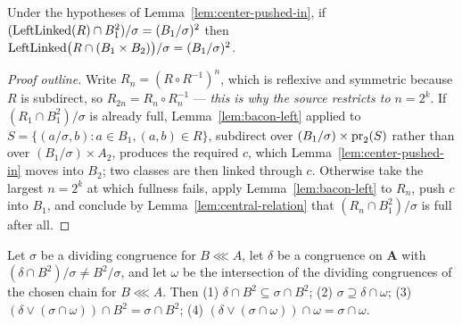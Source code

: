 \begin{lemma}\label{lem:leftlinked-stay-full}
Under the hypotheses of Lemma~\ref{lem:center-pushed-in}, if
$(\operatorname{LeftLinked}(R)\cap B_{1}^{2})/\sigma=(B_{1}/\sigma)^{2}$ then
$\operatorname{LeftLinked}\bigl(R\cap(B_{1}\times B_{2})\bigr)/\sigma=
(B_{1}/\sigma)^{2}$.
\end{lemma}

\begin{proof}[Proof outline]
Write $R_{n}=(R\circ R^{-1})^{n}$, which is reflexive and symmetric because $R$
is subdirect, so $R_{2n}=R_{n}\circ R_{n}^{-1}$ --- \emph{this is why the
source restricts to $n=2^{k}$}. If $(R_{1}\cap B_{1}^{2})/\sigma$ is already
full, Lemma~\ref{lem:bacon-left} applied to
$S=\{(a/\sigma,b):a\in B_{1},(a,b)\in R\}$, subdirect over
$(B_{1}/\sigma)\times\operatorname*{pr}_{2}(S)$ rather than over $(B_{1}/\sigma)\times A_{2}$,
produces the required $c$, which Lemma~\ref{lem:center-pushed-in} moves into
$B_{2}$; two classes are then linked through $c$. Otherwise take the largest
$n=2^{k}$ at which fullness fails, apply Lemma~\ref{lem:bacon-left} to $R_{n}$,
push $c$ into $B_{1}$, and conclude by Lemma~\ref{lem:central-relation} that
$(R_{n}\cap B_{1}^{2})/\sigma$ is full after all.
\end{proof}

\begin{longlemma}\label{lem:cut-or-nothing}
Let $\sigma$ be a dividing congruence for $B\lll A$, let $\delta$ be a
congruence on $\mathbf A$ with $(\delta\cap B^{2})/\sigma\neq B^{2}/\sigma$, and
let $\omega$ be the intersection of the dividing congruences of the chosen chain
for $B\lll A$. Then \textup{(1)} $\delta\cap B^{2}\subseteq\sigma\cap B^{2}$;
\textup{(2)} $\sigma\supseteq\delta\cap\omega$; \textup{(3)}
$(\delta\vee(\sigma\cap\omega))\cap B^{2}=\sigma\cap B^{2}$; \textup{(4)}
$(\delta\vee(\sigma\cap\omega))\cap\omega=\sigma\cap\omega$.
\end{longlemma}

